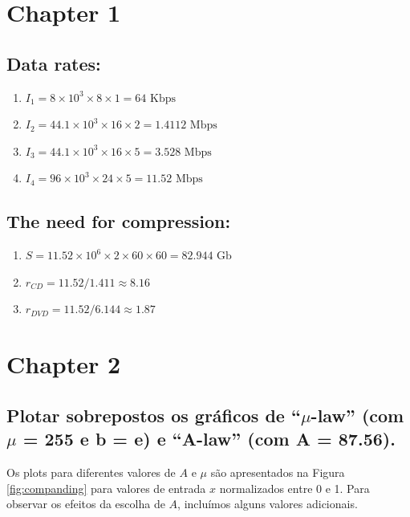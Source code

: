 \documentclass[a4paper]{article}
\begin{document}


\section{Chapter 1}

\subsection{Data rates:}

\begin{enumerate}
    \item $I_1=	8\times10^3\times8\times1=64 \text{ Kbps}$
	\item $I_2=44.1\times10^3\times16\times2=1.4112\text{ Mbps}$
	\item $I_3=44.1\times10^3\times16\times5=3.528 \text{ Mbps}$
	\item $I_4=96\times10^3\times24\times5=11.52 \text{ Mbps}$
\end{enumerate}

\subsection{The need for compression:}

\begin{enumerate}
    \item $	S=11.52\times10^6\times2\times60\times60=82.944 \text{ Gb}$
	\item $	r_{CD}=11.52/1.411\approx8.16$
	\item $	r_{DVD}=11.52/6.144\approx1.87$
\end{enumerate}

\section{Chapter 2}


\subsection{Plotar sobrepostos os gráficos de “$\mu$-law” (com $\mu$ = 255 e b = e) e “A-law” (com A = 87.56).}

Os plots para diferentes valores de $A$ e $\mu$ são apresentados na Figura \ref{fig:companding} para valores de entrada $x$ normalizados entre 0 e 1. Para observar os efeitos da escolha de $A$, incluímos alguns valores adicionais. 
\end{document}
